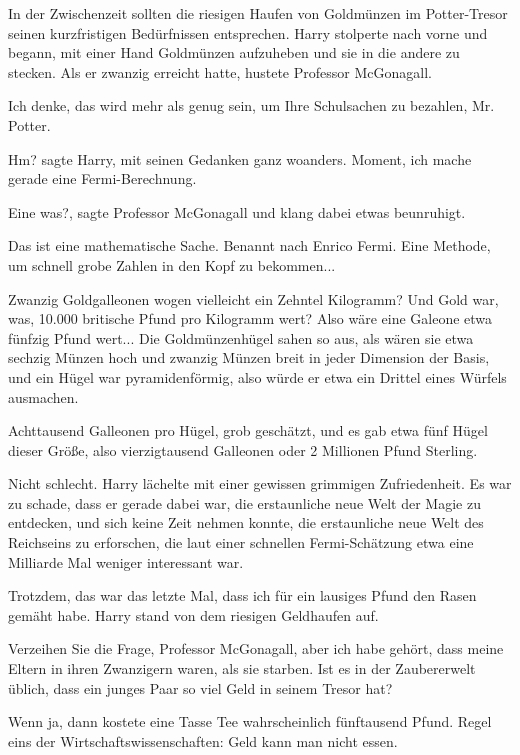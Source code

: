 In der Zwischenzeit sollten die riesigen Haufen von Goldmünzen im Potter-Tresor
seinen kurzfristigen Bedürfnissen entsprechen. Harry stolperte nach vorne und
begann, mit einer Hand Goldmünzen aufzuheben und sie in die andere zu stecken.
Als er zwanzig erreicht hatte, hustete Professor McGonagall.

\glqq{}Ich denke, das wird mehr als genug sein, um Ihre Schulsachen zu bezahlen,
Mr. Potter.\grqq{}

\glqq{}Hm?\grqq{} sagte Harry, mit seinen Gedanken ganz woanders. \glqq{}Moment,
ich mache gerade eine Fermi-Berechnung.\grqq{}

\glqq{}Eine was?\grqq{}, sagte Professor McGonagall und klang dabei etwas
beunruhigt.

\glqq{}Das ist eine mathematische Sache. Benannt nach Enrico Fermi. Eine Methode,
um schnell grobe Zahlen in den Kopf zu bekommen...\grqq{}

Zwanzig Goldgalleonen wogen vielleicht ein Zehntel Kilogramm? Und Gold war, was,
10.000 britische Pfund pro Kilogramm wert? Also wäre eine Galeone etwa fünfzig
Pfund wert... Die Goldmünzenhügel sahen so aus, als wären sie etwa sechzig
Münzen hoch und zwanzig Münzen breit in jeder Dimension der Basis, und ein Hügel
war pyramidenförmig, also würde er etwa ein Drittel eines Würfels ausmachen.

Achttausend Galleonen pro Hügel, grob geschätzt, und es gab etwa fünf Hügel
dieser Größe, also vierzigtausend Galleonen oder 2 Millionen Pfund Sterling.

Nicht schlecht. Harry lächelte mit einer gewissen grimmigen Zufriedenheit. Es
war zu schade, dass er gerade dabei war, die erstaunliche neue Welt der Magie zu
entdecken, und sich keine Zeit nehmen konnte, die erstaunliche neue Welt des
Reichseins zu erforschen, die laut einer schnellen Fermi-Schätzung etwa eine
Milliarde Mal weniger interessant war.

Trotzdem, das war das letzte Mal, dass ich für ein lausiges Pfund den Rasen
gemäht habe. Harry stand von dem riesigen Geldhaufen auf.

\glqq{}Verzeihen Sie die Frage, Professor McGonagall, aber ich habe gehört, dass
meine Eltern in ihren Zwanzigern waren, als sie starben. Ist es in der
Zaubererwelt üblich, dass ein junges Paar so viel Geld in seinem Tresor
hat?\grqq{}

Wenn ja, dann kostete eine Tasse Tee wahrscheinlich fünftausend Pfund. Regel
eins der Wirtschaftswissenschaften: Geld kann man nicht essen.

